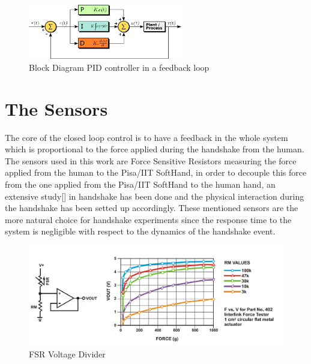 \begin{figure}[h]
\centering
\includegraphics[width=0.6\textwidth]{Figure/PID.png}
\caption{Block Diagram PID controller in a feedback loop}
\label{Fig:PID}
\end{figure}

\section{The Sensors}
The core of the closed loop control is to have a feedback in the whole system which is proportional to the force applied during the handshake from the human. 
The sensors used in this work are Force Sensitive Resistors measuring the force applied from the human to the Pisa/IIT SoftHand, in order to decouple this force from the one applied from the Pisa/IIT SoftHand to the human hand, an extensive study[\cite{espen}] in handshake has been done and the physical interaction during the handshake has been setted up accordingly.
These mentioned sensors are the more natural choice for handshake experiments since the response time to the system is negligible with respect to the dynamics of the handshake event.

 
\begin{figure}[ht]
\centering
\includegraphics[width=\textwidth]{Figure/fsr.png}
\caption{FSR Voltage Divider}
\label{Fig:FSRcircuit}
\end{figure}


